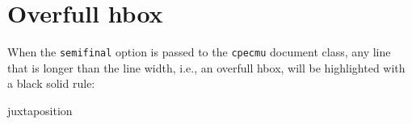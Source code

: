 






\section{Overfull hbox}

When the \verb.semifinal. option is passed to the \verb.cpecmu. document class,
any line that is longer than the line width, i.e., an overfull hbox, will be
highlighted with a black solid rule:
\begin{center}
\begin{minipage}{10em}
juxtaposition
\end{minipage}
\end{center}

